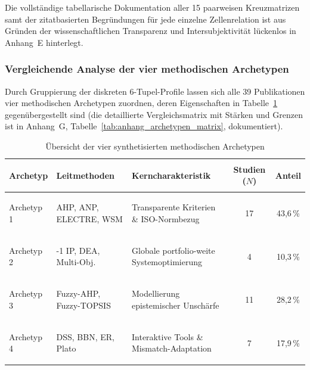 Die vollständige tabellarische Dokumentation aller 15 paarweisen Kreuzmatrizen samt der zitatbasierten Begründungen für jede einzelne Zellenrelation ist aus Gründen der wissenschaftlichen Transparenz und Intersubjektivität lückenlos in Anhang~E hinterlegt.

\subsubsection{Vergleichende Analyse der vier methodischen Archetypen}
\label{subsubsec:archetypen_analyse}

Durch Gruppierung der diskreten 6-Tupel-Profile lassen sich alle 39 Publikationen vier methodischen Archetypen zuordnen, deren Eigenschaften in Tabelle~\ref{tab:archetypen_matrix} gegenübergestellt sind (die detaillierte Vergleichsmatrix mit Stärken und Grenzen ist in Anhang~G, Tabelle~\ref{tab:anhang_archetypen_matrix}, dokumentiert).

\begin{table}[htbp]
  \centering
  \small
  \caption{Übersicht der vier synthetisierten methodischen Archetypen}
  \label{tab:archetypen_matrix}
  \begin{tabularx}{\textwidth}{>{\bfseries\raggedright\arraybackslash}p{2.8cm}>{\raggedright\arraybackslash}p{3.2cm}>{\raggedright\arraybackslash}Xcc}
    \toprule
    Archetyp & Leitmethoden & Kerncharakteristik & Studien ($N$) & Anteil \\
    \midrule
    Archetyp 1 & AHP, ANP, ELECTRE, WSM & Transparente Kriterien \& ISO-Normbezug & 17 & 43,6\,\% \\
    Archetyp 2 & 0-1 IP, DEA, Multi-Obj. & Globale portfolio-weite Systemoptimierung & 4 & 10,3\,\% \\
    Archetyp 3 & Fuzzy-AHP, Fuzzy-TOPSIS & Modellierung epistemischer Unschärfe & 11 & 28,2\,\% \\
    Archetyp 4 & DSS, BBN, ER, Plato & Interaktive Tools \& Mismatch-Adaptation & 7 & 17,9\,\% \\
    \bottomrule
  \end{tabularx}
\end{table}


